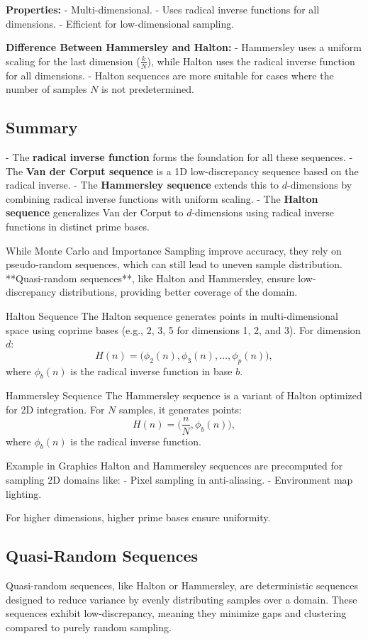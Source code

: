 \documentclass{article}
\begin{document}
\textbf{Properties:}
- Multi-dimensional.
- Uses radical inverse functions for all dimensions.
- Efficient for low-dimensional sampling.

\textbf{Difference Between Hammersley and Halton:}
- Hammersley uses a uniform scaling for the last dimension (\( \frac{k}{N} \)), while Halton uses the radical inverse function for all dimensions.
- Halton sequences are more suitable for cases where the number of samples \( N \) is not predetermined.

\subsection{Summary}
- The \textbf{radical inverse function} forms the foundation for all these sequences.
- The \textbf{Van der Corput sequence} is a 1D low-discrepancy sequence based on the radical inverse.
- The \textbf{Hammersley sequence} extends this to \( d \)-dimensions by combining radical inverse functions with uniform scaling.
- The \textbf{Halton sequence} generalizes Van der Corput to \( d \)-dimensions using radical inverse functions in distinct prime bases.

While Monte Carlo and Importance Sampling improve accuracy, they rely on pseudo-random sequences, which can still lead to uneven sample distribution. **Quasi-random sequences**, like Halton and Hammersley, ensure low-discrepancy distributions, providing better coverage of the domain.

Halton Sequence
The Halton sequence generates points in multi-dimensional space using coprime bases (e.g., 2, 3, 5 for dimensions 1, 2, and 3). For dimension \( d \):
\[ H(n) = \bigg(\phi_2(n), \phi_3(n), \dots, \phi_p(n) \bigg), \]
where \( \phi_b(n) \) is the radical inverse function in base \( b \).

Hammersley Sequence
The Hammersley sequence is a variant of Halton optimized for 2D integration. For \( N \) samples, it generates points:
\[ H(n) = \bigg(\frac{n}{N}, \phi_b(n)\bigg), \]
where \( \phi_b(n) \) is the radical inverse function.

Example in Graphics
Halton and Hammersley sequences are precomputed for sampling 2D domains like:
- Pixel sampling in anti-aliasing.
- Environment map lighting.

For higher dimensions, higher prime bases ensure uniformity.

\subsection{Quasi-Random Sequences}
Quasi-random sequences, like Halton or Hammersley, are deterministic sequences designed to reduce variance by evenly distributing samples over a domain. These sequences exhibit low-discrepancy, meaning they minimize gaps and clustering compared to purely random sampling.
\end{document}
